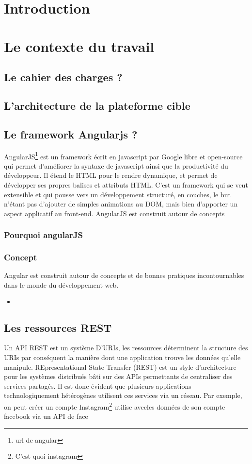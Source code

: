 \documentclass[a4paper,11pt]{report}
\begin{document}
\chapter{Introduction}


\chapter{Le contexte du travail}
\section{Le cahier des charges ?}
\section{L'architecture de la plateforme cible}
\section{Le framework Angularjs ?}

AngularJS\footnote{url de angular} est un framework écrit en javascript par Google libre et
open-source qui permet d'améliorer  la syntaxe de javascript ainsi que la productivité du
développeur. Il étend le HTML pour le rendre dynamique, et permet de développer ses propres
balises et attributs HTML. C’est un framework qui se veut extensible et qui pousse vers un 
développement structuré, en couches, le but n’étant pas d’ajouter de simples animations au
DOM, mais bien d’apporter un aspect applicatif au front-end. AngularJS est construit autour
de concepts 
\subsection{Pourquoi angularJS}

\subsection{Concept}
Angular est construit autour de concepts et de bonnes pratiques
incontournables dans le monde du développement web.

\begin{itemize}
 \item 
\end{itemize}

   
  

\section{Les ressources REST}
Un API REST est un système D'URIs, les ressources déterminent la structure des URIs par 
conséquent  la manière dont une application trouve les données qu'elle manipule.
REpresentational State Transfer (REST) est un style d’architecture pour les systèmes
distribués bâti sur des APIs permettants de centraliser des services partagés. Il est 
donc évident que plusieurs applications technologiquement hétérogènes utilisent ces services
via un réseau. Par exemple, on peut créer un compte Instagram\footnote{C'est quoi instagram}
utilise avecles données de son compte facebook via un API de face
\end{document}
